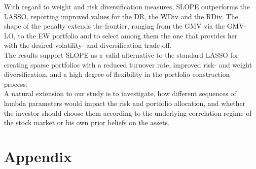 \documentclass[12pt, a4paper]{article}
\begin{document}
With regard to weight and risk diversification measures, SLOPE outperforms the LASSO, reporting improved values for the DR, the WDiv and the RDiv. The shape of the penalty extends the frontier, ranging from the GMV via the GMV-LO, to the EW portfolio and to select among them the one that provides her with the desired volatility- and diversification trade-off.\\
The results support SLOPE as a valid alternative to the standard LASSO for creating sparse portfolios with a reduced turnover rate, improved risk- and weight diversification, and a high degree of flexibility in the portfolio construction process.\\
A natural extension to our study is to investigate, how different sequences of lambda parameters would impact the risk and portfolio allocation, and whether the investor should choose them according to the underlying correlation regime of the stock market or his own prior beliefs on the assets.


\newpage
\section{Appendix}
\end{document}
